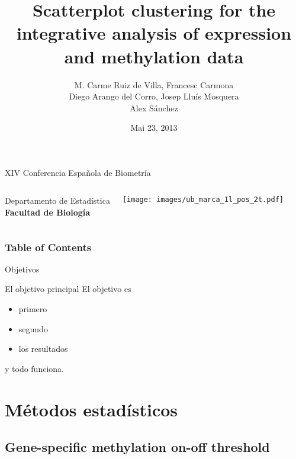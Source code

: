 \documentclass[handout]{beamer}
\title[Scatterplot clustering]{Scatterplot clustering for the integrative analysis of expression and methylation data}
\author[Ruiz de Villa]{M. Carme Ruiz de Villa, Francesc Carmona \\ Diego Arango del Corro, Josep Lluís Mosquera 
\\ Alex Sánchez}
\date[2013-05-23]{Mai 23, 2013}
\begin{document}
\begin{frame}
\begin{scriptsize}
\begin{center}
   XIV Conferencia Española de Biometría
\end{center}
\end{scriptsize}

\titlepage

\begin{columns}
   \scriptsize
   Departamento de Estadística \\ \textbf{Facultad de Biología}
    
   \hfill{}
   \texttt{[image: images/ub\_marca\_1l\_pos\_2t.pdf]}
\end{columns}
\end{frame}


\begin{frame}
\frametitle{Table of Contents}
\tableofcontents
\end{frame}


\begin{frame}{Objetivos}
\begin{block}{El objetivo principal}
El objetivo es
\begin{itemize}
\item primero
\item segundo
\item los resultados 
\end{itemize}
y todo funciona. 
\end{block}
\end{frame}

\section{Métodos estadísticos}

\subsection{Gene-specific methylation on-off threshold}
\end{document}
